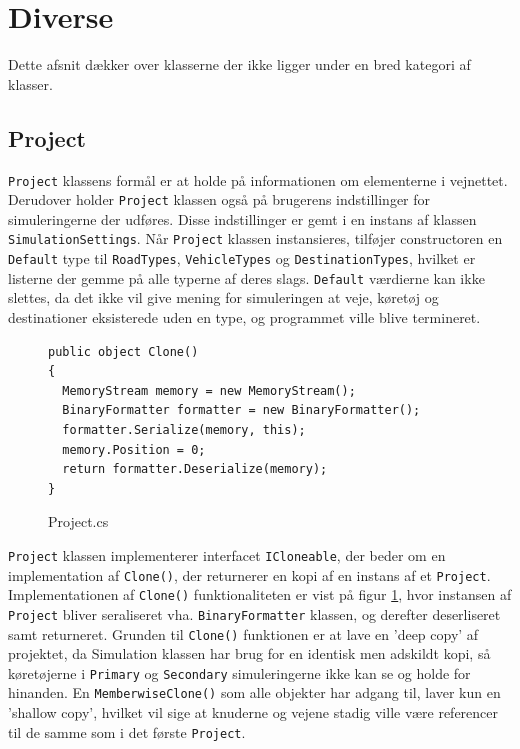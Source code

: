 \section{Diverse}\label{Diverse}
Dette afsnit dækker over klasserne der ikke ligger under en bred kategori af klasser.

\subsection{Project}
\texttt{Project} klassens formål er at holde på informationen om elementerne i vejnettet. Derudover holder \texttt{Project} klassen også på brugerens indstillinger for simuleringerne der udføres. Disse indstillinger er gemt i en instans af klassen \texttt{SimulationSettings}. Når \texttt{Project} klassen instansieres, tilføjer constructoren en \texttt{Default} type til \texttt{RoadTypes}, \texttt{VehicleTypes} og \texttt{DestinationTypes}, hvilket er listerne der gemme på alle typerne af deres slags. \texttt{Default} værdierne kan ikke slettes, da det ikke vil give mening for simuleringen at veje, køretøj og destinationer eksisterede uden en type, og programmet ville blive termineret. 

\begin{figure}[H]
\begin{lstlisting} 
public object Clone()
{
  MemoryStream memory = new MemoryStream();
  BinaryFormatter formatter = new BinaryFormatter();
  formatter.Serialize(memory, this);
  memory.Position = 0;
  return formatter.Deserialize(memory);
}
\end{lstlisting}
\caption{Project.cs}\label{Project}
\end{figure}

\texttt{Project} klassen implementerer interfacet \texttt{ICloneable}, der beder om en implementation af \texttt{Clone()}, der returnerer en kopi af en instans af et \texttt{Project}. Implementationen af \texttt{Clone()} funktionaliteten er vist på figur \ref{Project}, hvor instansen af \texttt{Project} bliver seraliseret vha. \texttt{BinaryFormatter} klassen, og derefter deserliseret samt returneret. Grunden til \texttt{Clone()} funktionen er at lave en 'deep copy' af projektet, da Simulation klassen har brug for en identisk men adskildt kopi, så køretøjerne i \texttt{Primary} og \texttt{Secondary} simuleringerne ikke kan se og holde for hinanden. En \texttt{MemberwiseClone()} som alle objekter har adgang til, laver kun en 'shallow copy', hvilket vil sige at knuderne og vejene stadig ville være referencer til de samme som i det første \texttt{Project}.

